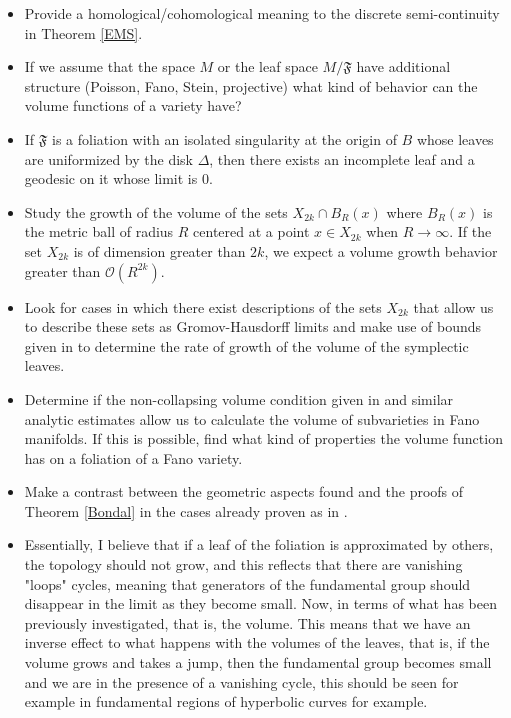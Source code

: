 \documentclass[12pt,twoside,a4paper]{report}
\newcommand{\osheaf}{\ensuremath{\mathcal O }}
\begin{document}
\begin{itemize}
        \item Provide a homological/cohomological meaning to the discrete semi-continuity in Theorem \ref{EMS}.

        \item If we assume that the space $M$ or the leaf space $M/\mathfrak{F}$ have additional structure (Poisson, Fano, Stein, projective)
        what kind of behavior can the volume functions of a variety have?

        \item If $\mathfrak{F}$ is a foliation with an isolated singularity at the origin of $B$ whose leaves are uniformized by the disk $\Delta$,
        then there exists an incomplete leaf and a geodesic on it whose limit is $0$.

        \item Study the growth of the volume of the sets $X_{2k}\cap B_{R}(x)$ where $B_R(x)$ is the metric ball
        of radius $R$ centered at a point $x\in X_{2k}$ when $R\rightarrow\infty$. If the set $X_{2k}$ is
        of dimension greater than $2k$, we expect a volume growth behavior greater than $\osheaf(R^{2k}).$

        \item Look for cases in which there exist descriptions of the sets $X_{2k}$ that allow us to describe these sets
        as Gromov-Hausdorff limits and make use of bounds given in \cite{D-SS} to determine the rate of growth
        of the volume of the symplectic leaves.

        \item Determine if the non-collapsing volume condition given in \cite{D-SS} and similar analytic estimates
        allow us to calculate the volume of subvarieties in Fano manifolds. If this is possible, find
        what kind of properties the volume function has on a foliation of a Fano variety.

        \item Make a contrast between the geometric aspects found and the proofs of Theorem \ref{Bondal} in the
        cases already proven as in \cite{Gua-Pym}.

        \item Essentially, I believe that if a leaf of the foliation is approximated by others, the topology should not grow, and this reflects that there are vanishing "loops" cycles, meaning that generators of the fundamental group should disappear in the limit as they become small. Now, in terms of what has been previously investigated, that is, the volume. This means that we have an inverse effect to what happens with the volumes of the leaves, that is, if the volume grows and takes a jump, then the fundamental group becomes small and we are in the presence of a vanishing cycle, this should be seen for example in fundamental regions of hyperbolic curves for example.

\end{itemize}
\end{document}
